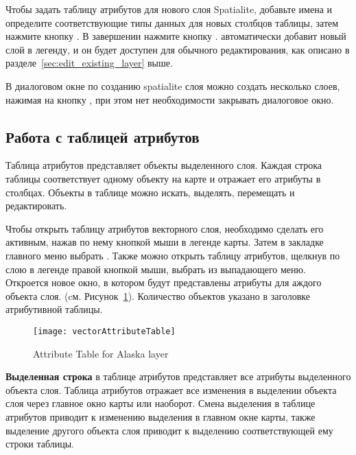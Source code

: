 Чтобы задать таблицу атрибутов для нового слоя Spatialite, добавьте имена
и определите соответствующие типы данных для новых столбцов таблицы, затем
нажмите кнопку . В завершении нажмите кнопку .
\qg автоматически добавит новый слой в легенду, и он будет доступен для
обычного редактирования, как описано в разделе~\ref{sec:edit_existing_layer} выше.

В диалоговом окне по созданию spatialite слоя можно создать несколько слоев,
нажимая на кнопку , при этом нет необходимости закрывать
диалоговое окно.

\subsection{Работа с таблицей атрибутов}
\label{sec:attribute table}

Таблица атрибутов представляет объекты выделенного слоя. Каждая строка таблицы
соответствует одному объекту на карте и отражает его атрибуты в столбцах.
Объекты в таблице можно искать, выделять, перемещать и редактировать.

Чтобы открыть таблицу атрибутов векторного слоя, необходимо сделать его активным,
нажав по нему кнопкой мыши в легенде карты. Затем в закладке 
главного меню выбрать .
Также можно открыть таблицу атрибутов, щелкнув по слою в легенде правой
кнопкой мыши, выбрать 
из выпадающего меню. Откроется новое окно, в котором будут представлены атрибуты
для аждого объекта слоя. (cм. Рисунок~\ref{fig:attributetable}). Количество
объектов указано в заголовке атрибутивной таблицы.

\begin{figure}[ht]
   \centering
   \texttt{[image: vectorAttributeTable]}
   \caption{Attribute Table for Alaska layer \nixcaption}\label{fig:attributetable}
\end{figure}


\textbf{Выделенная строка} в таблице атрибутов представляет все атрибуты
выделенного объекта слоя. Таблица атрибутов отражает все изменения в
выделении объекта слоя через главное окно карты или наоборот. Смена
выделения в таблице атрибутов приводит к изменению выделения в главном
окне карты, также выделение другого объекта слоя приводит к выделению
соответствующей ему строки таблицы.

